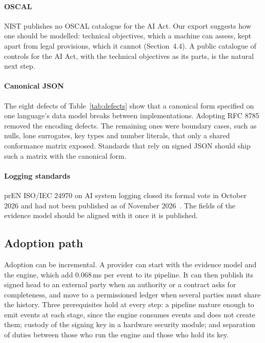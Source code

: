 \paragraph{OSCAL} NIST publishes no OSCAL catalogue for the AI Act. Our export suggests how one should be modelled: technical objectives, which a machine can assess, kept apart from legal provisions, which it cannot (Section~4.4). A public catalogue of controls for the AI Act, with the technical objectives as its parts, is the natural next step.

\paragraph{Canonical JSON} The eight defects of Table~\ref{tab:defects} show that a canonical form specified on one language's data model breaks between implementations. Adopting RFC 8785 removed the encoding defects. The remaining ones were boundary cases, such as nulls, lone surrogates, key types and number literals, that only a shared conformance matrix exposed. Standards that rely on signed JSON should ship such a matrix with the canonical form.

\paragraph{Logging standards} prEN ISO/IEC 24970 on AI system logging closed its formal vote in October 2026 and had not been published as of November 2026~\cite{iso24970}. The fields of the evidence model should be aligned with it once it is published.

\subsection{Adoption path}
\label{sec:disc-adoption}

Adoption can be incremental. A provider can start with the evidence model and the engine, which add 0.068\,ms per event to its pipeline. It can then publish its signed head to an external party when an authority or a contract asks for completeness, and move to a permissioned ledger when several parties must share the history. Three prerequisites hold at every step: a pipeline mature enough to emit events at each stage, since the engine consumes events and does not create them; custody of the signing key in a hardware security module; and separation of duties between those who run the engine and those who hold its key.
